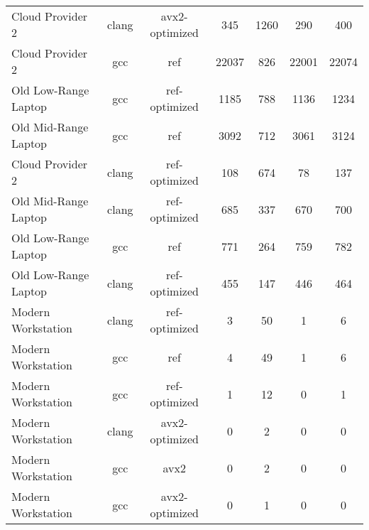 \begin{table}
\begin{tabularx}{\linewidth}{l c c c c c c}
            Cloud Provider 2 &                clang &       avx2-optimized &                  345 &                 1260 &                  290 &                  400\\
            Cloud Provider 2 &                  gcc &                  ref &                22037 &                  826 &                22001 &                22074\\
        Old Low-Range Laptop &                  gcc &        ref-optimized &                 1185 &                  788 &                 1136 &                 1234\\
        Old Mid-Range Laptop &                  gcc &                  ref &                 3092 &                  712 &                 3061 &                 3124\\
            Cloud Provider 2 &                clang &        ref-optimized &                  108 &                  674 &                   78 &                  137\\
        Old Mid-Range Laptop &                clang &        ref-optimized &                  685 &                  337 &                  670 &                  700\\
        Old Low-Range Laptop &                  gcc &                  ref &                  771 &                  264 &                  759 &                  782\\
        Old Low-Range Laptop &                clang &        ref-optimized &                  455 &                  147 &                  446 &                  464\\
          Modern Workstation &                clang &        ref-optimized &                    3 &                   50 &                    1 &                    6\\
          Modern Workstation &                  gcc &                  ref &                    4 &                   49 &                    1 &                    6\\
          Modern Workstation &                  gcc &        ref-optimized &                    1 &                   12 &                    0 &                    1\\
          Modern Workstation &                clang &       avx2-optimized &                    0 &                    2 &                    0 &                    0\\
          Modern Workstation &                  gcc &                 avx2 &                    0 &                    2 &                    0 &                    0\\
          Modern Workstation &                  gcc &       avx2-optimized &                    0 &                    1 &                    0 &                    0\\
        \bottomrule
    \end{tabularx}
\end{table}